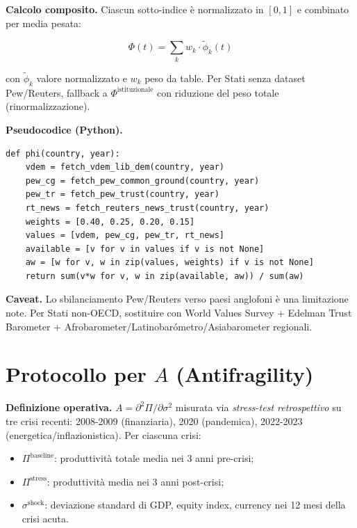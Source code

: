 \Proved{} \textbf{Calcolo composito.} Ciascun sotto-indice è
normalizzato in \([0, 1]\) e combinato per media pesata:

\[
\Phi(t) = \sum_k w_k \cdot \tilde{\phi}_k(t)
\]

con \(\tilde{\phi}_k\) valore normalizzato e \(w_k\) peso da table.
Per Stati senza dataset Pew/Reuters, fallback a
\(\Phi^{\text{istituzionale}}\) con riduzione del peso totale
(rinormalizzazione).

\Hypoth{} \textbf{Pseudocodice (Python).}

\begin{verbatim}
def phi(country, year):
    vdem = fetch_vdem_lib_dem(country, year)
    pew_cg = fetch_pew_common_ground(country, year)
    pew_tr = fetch_pew_trust(country, year)
    rt_news = fetch_reuters_news_trust(country, year)
    weights = [0.40, 0.25, 0.20, 0.15]
    values = [vdem, pew_cg, pew_tr, rt_news]
    available = [v for v in values if v is not None]
    aw = [w for v, w in zip(values, weights) if v is not None]
    return sum(v*w for v, w in zip(available, aw)) / sum(aw)
\end{verbatim}

\Conj{} \textbf{Caveat.} Lo sbilanciamento Pew/Reuters verso paesi
anglofoni è una limitazione note. Per Stati non-OECD, sostituire con
World Values Survey + Edelman Trust Barometer +
Afrobarometer/Latinobarómetro/Asiabarometer regionali.



\section{\texorpdfstring{Protocollo per \(A\)
(Antifragility)}{Protocollo per A (Antifragility)}}\label{protocollo-per-a-antifragilituxe0}

\Hypoth{} \textbf{Definizione operativa.}
\(A = \partial^2\Pi/\partial\sigma^2\) misurata via \emph{stress-test
retrospettivo} su tre crisi recenti: 2008-2009 (finanziaria), 2020
(pandemica), 2022-2023 (energetica/inflazionistica). Per ciascuna crisi:

\begin{itemize}
\tightlist
\item
  \(\Pi^{\text{baseline}}\): produttività totale media nei 3 anni
  pre-crisi;
\item
  \(\Pi^{\text{stress}}\): produttività media nei 3 anni post-crisi;
\item
  \(\sigma^{\text{shock}}\): deviazione standard di GDP, equity index,
  currency nei 12 mesi della crisi acuta.
\end{itemize}

